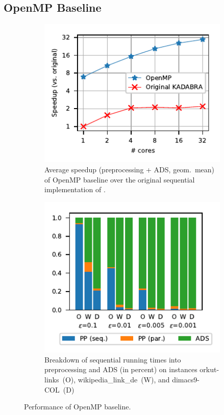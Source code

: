 \subsection{OpenMP Baseline}
%
\begin{figure}[t]
\centering
\begin{subfigure}[t]{.48\textwidth}
\centering
\includegraphics{sources/plots/betw-apx/original-vs-baseline.pdf}
\caption{Average speedup (preprocessing + ADS, geom.\ mean) of OpenMP baseline over
the original sequential implementation of \kadabra.}
\label{fig:betw-apx:original-vs-baseline}
\end{subfigure}\hfill
\begin{subfigure}[t]{.48\textwidth}
\centering
\includegraphics{sources/plots/betw-apx/time-breakdown.pdf}
\caption{Breakdown of sequential \kadabra running times into preprocessing and ADS
(in percent) on instances orkut-links~(O), wikipedia\_link\_de~(W), and
dimacs9-COL~(D)}
\label{fig:betw-apx:time-breakdown}
\end{subfigure}
\caption{Performance of OpenMP baseline.}
\end{figure}

